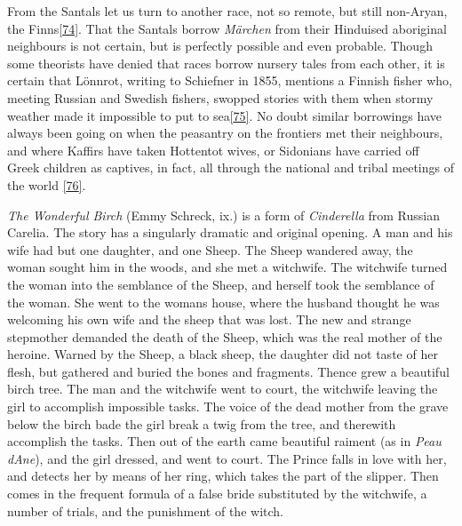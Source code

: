 \documentclass[14pt,a4paper]{memoir}
\begin{document}
From the Santals let us turn to another race, not so remote, but still
non-Aryan, the
Finns\protect\hypertarget{4533318093929944247_33931-h-1.htm.xhtmlux5cux23FNanchor_74}{}{}\protect\hyperlink{4533318093929944247_33931-h-1.htm.xhtmlux5cux23Footnote_74}{{[}74{]}}.
That the Santals borrow \emph{Märchen} from their Hinduised aboriginal
neighbours is not certain, but is perfectly possible and even probable.
Though some theorists have denied that races borrow nursery tales from
each other, it is certain that Lönnrot, writing to Schiefner in 1855,
mentions a Finnish fisher who, meeting Russian and Swedish fishers,
\textquotesingle swopped stories\textquotesingle{} with them when stormy
weather made it impossible to put to
sea\protect\hypertarget{4533318093929944247_33931-h-1.htm.xhtmlux5cux23FNanchor_75}{}{}\protect\hyperlink{4533318093929944247_33931-h-1.htm.xhtmlux5cux23Footnote_75}{{[}75{]}}.
No doubt similar borrowings have always been going on when the peasantry
on the frontiers met their neighbours, and where Kaffirs have taken
Hottentot wives, or Sidonians have carried off Greek children as
captives, in fact, all through the national and tribal meetings of the
world\protect\hypertarget{4533318093929944247_33931-h-1.htm.xhtmlux5cux23FNanchor_76}{}{}
\protect\hyperlink{4533318093929944247_33931-h-1.htm.xhtmlux5cux23Footnote_76}{{[}76{]}}.

\emph{The Wonderful Birch} (Emmy Schreck, ix.) is a form of
\emph{Cinderella} from Russian Carelia. The story has a singularly
dramatic and original opening. A man and his wife had but one daughter,
and one Sheep. The Sheep wandered away, the woman sought him in the
woods, and she met a witchwife. The witchwife turned the woman into the
semblance of the Sheep, and herself took the semblance of the woman. She
went to the woman\textquotesingle s house, where the husband thought he
was welcoming his own wife and the sheep that was lost. The new and
strange stepmother demanded the death of the Sheep, which was the real
mother of the heroine. Warned by the Sheep, a black sheep, the daughter
did not taste of her flesh, but gathered and buried the bones and
fragments. Thence grew a beautiful birch tree. The man and the witchwife
went to court, the witchwife leaving the girl to accomplish impossible
tasks. The voice of the dead mother from the grave below the birch bade
the girl break a twig from the tree, and therewith accomplish the tasks.
Then out of the earth came beautiful raiment (as in \emph{Peau
d\textquotesingle Ane}), and the girl dressed, and went to court. The
Prince falls in love with her, and detects her by means of her ring,
which takes the part of the slipper. Then comes in the frequent formula
of a false bride substituted by the witchwife, a number of trials, and
the punishment of the witch.
\end{document}
